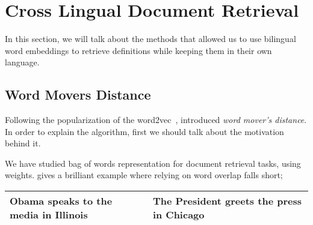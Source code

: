 \section{Cross Lingual Document Retrieval}%
\label{sec:cross_lingual_document_retrival}

In this section, we will talk about the methods that allowed us to use bilingual word embeddings to retrieve definitions while keeping them in their own language.

\subsection{Word Movers Distance}%
\label{sub:word_movers_distance}

Following the popularization of the word2vec~\cite{mikolov_distributed_2013}, \textcite{kusner_word_2015} introduced \emph{word mover's distance}.
In order to explain the algorithm, first we should talk about the motivation behind it.

We have studied bag of words representation for document retrieval tasks, using \tfidf{} weights.
\citeauthor{kusner_word_2015} gives a brilliant example where relying on word overlap falls short;

\begin{tabular}{l l}
    \midrule
    Obama speaks to the media in Illinois & The President greets the press in Chicago \\
    \midrule
\end{tabular}

